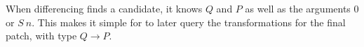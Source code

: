 When differencing finds a candidate, it knows $Q$ and $P$ as well as the arguments $0$ or $S\ n$.
This makes it simple for \sysname to later query the transformations for the final patch, with type $Q \rightarrow P$.




